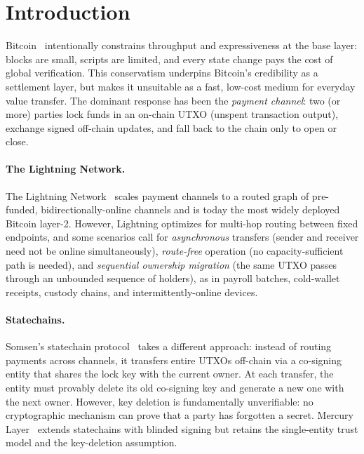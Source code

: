 \section{Introduction}\label{sec:intro}

Bitcoin~\cite{nakamoto2008bitcoin} intentionally constrains throughput and expressiveness at the base layer: blocks are small, scripts are limited, and every state change pays the cost of global verification. This conservatism underpins Bitcoin's credibility as a settlement layer, but makes it unsuitable as a fast, low-cost medium for everyday value transfer. The dominant response has been the \emph{payment channel}: two (or more) parties lock funds in an on-chain UTXO (unspent transaction output), exchange signed off-chain updates, and fall back to the chain only to open or close.

\paragraph{The Lightning Network.} The Lightning Network~\cite{poon2016lightning} scales payment channels to a routed graph of pre-funded, bidirectionally-online channels and is today the most widely deployed Bitcoin layer-2. However, Lightning optimizes for multi-hop routing between fixed endpoints, and some scenarios call for \emph{asynchronous} transfers (sender and receiver need not be online simultaneously), \emph{route-free} operation (no capacity-sufficient path is needed), and \emph{sequential ownership migration} (the same UTXO passes through an unbounded sequence of holders), as in payroll batches, cold-wallet receipts, custody chains, and intermittently-online devices.

\paragraph{Statechains.} Somsen's statechain protocol~\cite{somsen2020statechains} takes a different approach: instead of routing payments across channels, it transfers entire UTXOs off-chain via a co-signing entity that shares the lock key with the current owner. At each transfer, the entity must provably delete its old co-signing key and generate a new one with the next owner. However, key deletion is fundamentally unverifiable: no cryptographic mechanism can prove that a party has forgotten a secret. Mercury Layer~\cite{mercurylayer} extends statechains with blinded signing but retains the single-entity trust model and the key-deletion assumption.

